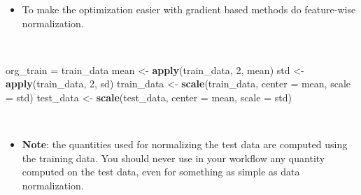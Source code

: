 \documentclass[10pt,ignorenonframetext,]{beamer}
\newenvironment{Shaded}{\begin{snugshade}}{\end{snugshade}}
\newcommand{\DataTypeTok}[1]{\textcolor[rgb]{0.13,0.29,0.53}{#1}}
\newcommand{\DecValTok}[1]{\textcolor[rgb]{0.00,0.00,0.81}{#1}}
\newcommand{\KeywordTok}[1]{\textcolor[rgb]{0.13,0.29,0.53}{\textbf{#1}}}
\newcommand{\NormalTok}[1]{#1}
\newcommand{\StringTok}[1]{\textcolor[rgb]{0.31,0.60,0.02}{#1}}
\providecommand{\tightlist}{%
  \setlength{\itemsep}{0pt}\setlength{\parskip}{0pt}}
\begin{document}
\begin{frame}[fragile]

\begin{itemize}
\tightlist
\item
  To make the optimization easier with gradient based methods do
  feature-wise normalization.
\end{itemize}

\(~\)

\scriptsize

\begin{Shaded}
\begin{Highlighting}[]
\NormalTok{org_train =}\StringTok{ }\NormalTok{train_data}
\NormalTok{mean <-}\StringTok{ }\KeywordTok{apply}\NormalTok{(train_data, }\DecValTok{2}\NormalTok{, mean)}
\NormalTok{std <-}\StringTok{ }\KeywordTok{apply}\NormalTok{(train_data, }\DecValTok{2}\NormalTok{, sd)}
\NormalTok{train_data <-}\StringTok{ }\KeywordTok{scale}\NormalTok{(train_data, }\DataTypeTok{center =}\NormalTok{ mean, }\DataTypeTok{scale =}\NormalTok{ std)}
\NormalTok{test_data <-}\StringTok{ }\KeywordTok{scale}\NormalTok{(test_data, }\DataTypeTok{center =}\NormalTok{ mean, }\DataTypeTok{scale =}\NormalTok{ std)}
\end{Highlighting}
\end{Shaded}

\(~\)

\normalsize

\begin{itemize}
\tightlist
\item
  \textbf{Note}: the quantities used for normalizing the test data are
  computed using the training data. You should never use in your
  workflow any quantity computed on the test data, even for something as
  simple as data normalization.
\end{itemize}

\end{frame}
\end{document}

